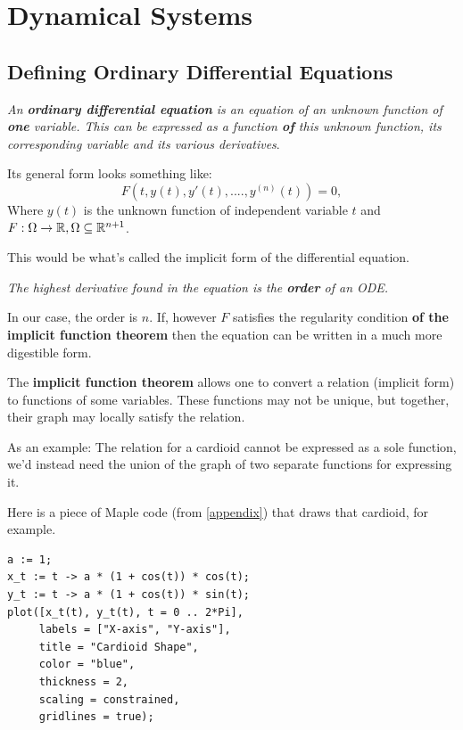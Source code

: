 \chapter{Dynamical Systems}
\label{chap:ch3}

\section{Defining Ordinary Differential Equations}
\cite{hunter2011introduction,binegar2008,maryland2022}
\begin{definition}
	\textit{An \textbf{ordinary differential equation} is an equation of an unknown function of \textbf{one} variable. This can be expressed as a function \textbf{of} this unknown function, its corresponding variable and its various derivatives}.
\end{definition}
Its general form looks something like:
\begin{equation}\label{ODE}
	F(t,y(t),y'(t),....,y^{(n)}(t))=0,
\end{equation}
Where $y(t)$ is the unknown function of independent variable $t$ and $F : \Omega \rightarrow \mathbb{R},  \\ \Omega \subseteq \mathbb{R}^{n+1}$.

This would be what's called the implicit form of the differential equation.

\begin{definition}
	\textit{The highest derivative found in the equation is the \textbf{order} of an ODE.}
\end{definition}
In our case, the order is $n$.
If, however $F$ satisfies the regularity condition \textbf{of the implicit function theorem} then the equation can be written in a much more digestible form.

The \textbf{implicit function theorem} allows one to convert a relation (implicit form) to functions of some variables. These functions may not be unique, but together, their graph may locally satisfy the relation.

As an example: The relation for a cardioid cannot be expressed as a sole function, we'd instead need the union of the graph of two separate functions for expressing it.

Here is a piece of Maple code (from \ref{appendix}) that draws that cardioid, for example.

\begin{verbatim}
a := 1;
x_t := t -> a * (1 + cos(t)) * cos(t);
y_t := t -> a * (1 + cos(t)) * sin(t);
plot([x_t(t), y_t(t), t = 0 .. 2*Pi],
     labels = ["X-axis", "Y-axis"],
     title = "Cardioid Shape",
     color = "blue",
     thickness = 2,
     scaling = constrained,
     gridlines = true);
\end{verbatim}

